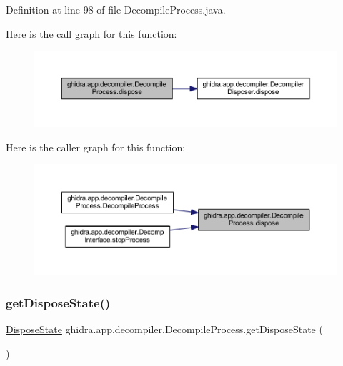Definition at line 98 of file Decompile\+Process.\+java.

Here is the call graph for this function\+:
\nopagebreak
\begin{figure}[H]
\begin{center}
\leavevmode
\includegraphics[width=350pt]{classghidra_1_1app_1_1decompiler_1_1_decompile_process_aa2643106f26e9f4e6e603431903f29e4_cgraph}
\end{center}
\end{figure}
Here is the caller graph for this function\+:
\nopagebreak
\begin{figure}[H]
\begin{center}
\leavevmode
\includegraphics[width=350pt]{classghidra_1_1app_1_1decompiler_1_1_decompile_process_aa2643106f26e9f4e6e603431903f29e4_icgraph}
\end{center}
\end{figure}
\mbox{\label{classghidra_1_1app_1_1decompiler_1_1_decompile_process_ac9ea5dc37b98e60a02ebc537bde184bb}} 
\subsubsection{\texorpdfstring{getDisposeState()}{getDisposeState()}}
{\footnotesize\ttfamily \mbox{\hyperlink{enumghidra_1_1app_1_1decompiler_1_1_decompile_process_1_1_dispose_state}{Dispose\+State}} ghidra.\+app.\+decompiler.\+Decompile\+Process.\+get\+Dispose\+State (\begin{DoxyParamCaption}{ }\end{DoxyParamCaption})\hspace{0.3cm}{\ttfamily [inline]}}



